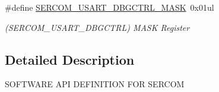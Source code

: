 \begin{DoxyCompactItemize}
\item 
\hypertarget{group___s_a_m_l21___s_e_r_c_o_m_gaa32171d792c3047315fbb3356a561a16}{}\#define \hyperlink{group___s_a_m_l21___s_e_r_c_o_m_gaa32171d792c3047315fbb3356a561a16}{S\+E\+R\+C\+O\+M\+\_\+\+U\+S\+A\+R\+T\+\_\+\+D\+B\+G\+C\+T\+R\+L\+\_\+\+M\+A\+S\+K}~0x01ul\label{group___s_a_m_l21___s_e_r_c_o_m_gaa32171d792c3047315fbb3356a561a16}

\begin{DoxyCompactList}\small\item\em (S\+E\+R\+C\+O\+M\+\_\+\+U\+S\+A\+R\+T\+\_\+\+D\+B\+G\+C\+T\+R\+L) M\+A\+S\+K Register \end{DoxyCompactList}\end{DoxyCompactItemize}


\subsection{Detailed Description}
S\+O\+F\+T\+W\+A\+R\+E A\+P\+I D\+E\+F\+I\+N\+I\+T\+I\+O\+N F\+O\+R S\+E\+R\+C\+O\+M 